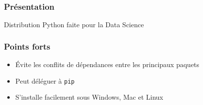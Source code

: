 \begin{frame}
  \frametitle{Présentation}
  Distribution Python faite pour la \og{}Data Science\fg{}

\end{frame}

\begin{frame}
  \frametitle{Points forts}
  \begin{itemize}
  \item Évite les conflits de dépendances entre les principaux paquets
  \item Peut déléguer à \texttt{pip}
  \item S'installe facilement sous Windows, Mac et Linux
  \end{itemize}
\end{frame}
